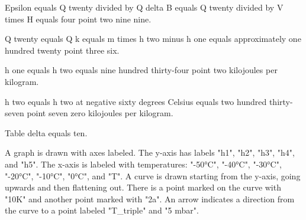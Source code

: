 Epsilon equals Q twenty divided by Q delta B equals Q twenty divided by V times H equals four point two nine nine.

Q twenty equals Q k equals m times h two minus h one equals approximately one hundred twenty point three six.

h one equals h two equals nine hundred thirty-four point two kilojoules per kilogram.

h two equals h two at negative sixty degrees Celsius equals two hundred thirty-seven point seven zero kilojoules per kilogram.

Table delta equals ten.

A graph is drawn with axes labeled. The y-axis has labels "h1", "h2", "h3", "h4", and "h5". The x-axis is labeled with temperatures: "-50°C", "-40°C", "-30°C", "-20°C", "-10°C", "0°C", and "T". A curve is drawn starting from the y-axis, going upwards and then flattening out. There is a point marked on the curve with "10K" and another point marked with "2a". An arrow indicates a direction from the curve to a point labeled "T_triple" and "5 mbar".